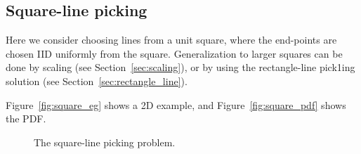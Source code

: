 \subsection{Square-line picking}
\label{sec:square_line}

Here we consider choosing lines from a unit square, where the
end-points are chosen IID uniformly from the square. Generalization to
larger squares can be done by scaling (see Section~\ref{sec:scaling}),
or by using the rectangle-line pick1ing solution (see
Section~\ref{sec:rectangle_line}).

Figure~\ref{fig:square_eg} shows a 2D example, and
Figure~\ref{fig:square_pdf} shows the PDF.

\begin{figure}[tbp]
  \begin{center}
    \hspace{6mm}
    \caption{The square-line picking problem.}
  \end{center} 
\vspace{-4mm}
\end{figure}

